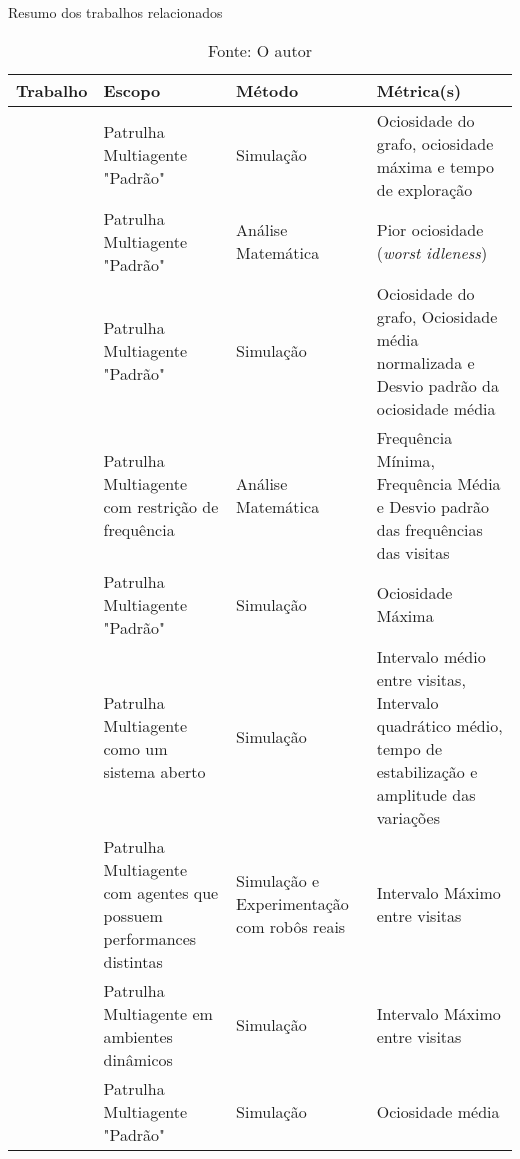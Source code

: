 \begin{table}[tp]
	\centering
	\caption{Resumo dos trabalhos relacionados}
	\label{tbl:comp_background}
	\begin{tabularx}{\linewidth}{|X|X|X|X|}
		\hline
		\textbf{Trabalho} & \textbf{Escopo} & \textbf{Método} & \textbf{Métrica(s)} \\
		\hline
		\citep{Machado:2002:MPE:1765317.1765332} & Patrulha Multiagente "Padrão" & Simulação & Ociosidade do grafo, ociosidade máxima e tempo de exploração \\
		\hline
		\citep{Chevaleyre:2004:TAM:1018411.1019013} & Patrulha Multiagente "Padrão" & Análise Matemática & Pior ociosidade (\textit{worst idleness}) \\
		\hline
		\citep{Almeida:2004:AAI} & Patrulha Multiagente "Padrão" & Simulação & Ociosidade do grafo, Ociosidade média normalizada e Desvio padrão da ociosidade média \\
		\hline
		\citep{4209122} & Patrulha Multiagente com restrição de frequência & Análise Matemática & Frequência Mínima, Frequência Média e Desvio padrão das frequências das visitas \\
		\hline
		\citep{4630897} & Patrulha Multiagente "Padrão" & Simulação & Ociosidade Máxima \\
		\hline
		\citep{6495145} & Patrulha Multiagente como um sistema aberto & Simulação & Intervalo médio entre visitas, Intervalo quadrático médio, tempo de estabilização e amplitude das variações \\
		\hline
		\citep{Pippin:2013:PBT:2480362.2480378} & Patrulha Multiagente com agentes que possuem performances distintas & Simulação e Experimentação com robôs reais & Intervalo Máximo entre visitas \\
		\hline
		\citep{6615158} & Patrulha Multiagente em ambientes dinâmicos & Simulação & Intervalo Máximo entre visitas \\
		\hline
		\citep{hernandez2013game} & Patrulha Multiagente "Padrão" & Simulação & Ociosidade média \\
		\hline
	\end{tabularx}
	\caption*{Fonte: O autor}
\end{table}